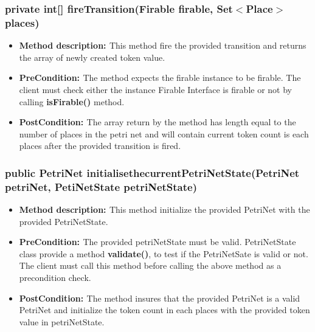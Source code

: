 \subsubsection*{\bf{private int[] fireTransition(Firable firable, Set$<$Place$>$ places)}}
\begin{itemize}[label={},leftmargin=2em]

\item {\bf{Method description: }} This method fire the provided transition and returns the array of newly created token value.


\item {\bf{PreCondition: } } The method expects the firable instance  to be firable. The client must check either the instance   Firable Interface  is  firable or not by calling  {\bf{isFirable()}} method.


\item {\bf{PostCondition: }} The array return by the method has length equal to the number of places in the petri net and will contain current token count is each places after the provided transition is fired.

\end{itemize}


\subsubsection*{\bf{public PetriNet initialisethecurrentPetriNetState(PetriNet petriNet, PetiNetState petriNetState)}}

\begin{itemize}[label={},leftmargin=2em]
\item {\bf{Method description: }} This method initialize the provided PetriNet with the provided PetriNetState.


\item {\bf{PreCondition: }} The provided petriNetState must be valid. PetriNetState class provide a method {\bf{validate()}}, to test if the  PetriNetSate is valid or not. The client must call this method before calling  the above method  as a  precondition check.


\item {\bf{PostCondition: }} The method insures that the provided PetriNet is a valid PetriNet and initialize the token count in each places with the provided token value in petriNetState.

\end{itemize}



